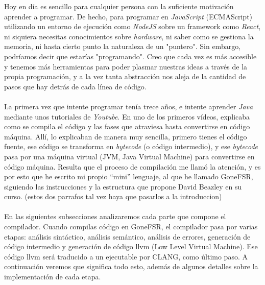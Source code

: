 
Hoy en día es sencillo para cualquier persona con la suficiente motivación aprender a programar. De hecho, para programar en \textit{JavaScript} (ECMAScript) utilizando un entorno de ejecución como \textit{NodeJS} sobre un framework como \textit{React}, ni siquiera necesitas conocimientos sobre \textit{hardware}, ni saber como se gestiona la memoria, ni hasta cierto punto la naturaleza de un "puntero". Sin embargo, podríamos decir que estarías "programando". Creo que cada vez es más accesible y tenemos más herramientas para poder plasmar nuestras ideas a través de la propia programación, y a la vez tanta abstracción nos aleja de la cantidad de pasos que hay detrás de cada línea de código.\\\\
La primera vez que intente programar tenía trece años, e intente aprender \textit{Java} mediante unos tutoriales de \textit{Youtube}. En uno de los primeros vídeos, explicaba como se compila el código y las fases que atraviesa hasta convertirse en código máquina. Allí, lo explicaban de manera muy sencilla, primero tienes el código fuente, ese código se transforma en \textit{bytecode} (o código intermedio), y ese \textit{bytecode} pasa por una máquina virtual (JVM, Java Virtual Machine) para convertirse en código máquina. Resulta que el proceso de compilación me llamó la atención, y es por esto que he escrito mi propio ``mini''  lenguaje, al que he llamado GoneFSR, siguiendo las instrucciones y la estructura que propone David Beazley en su curso. (estos dos parrafos tal vez haya que pasarlos a la introduccion)\\\\
En las siguientes subsecciones analizaremos cada parte que compone el compilador. Cuando compilas código en GoneFSR, el compilador pasa por varias etapas: análisis sintáctico, análisis semántico, análisis de errores, generación de código intermedio y generación de código llvm (Low Level Virtual Machine). Ese código llvm será traducido a un ejecutable por CLANG, como último paso. A continuación veremos que significa todo esto, además de algunos detalles sobre la implementación de cada etapa.
\newpage
